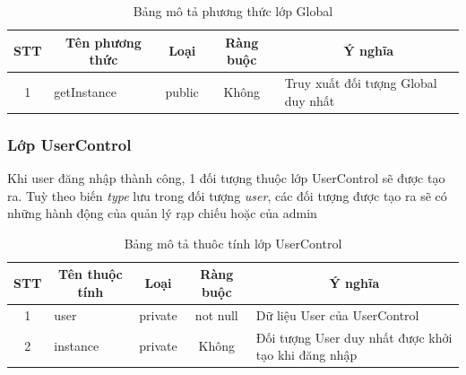 \documentclass[a4paper, 12pt]{article}
\begin{document}
\begin{table}[H]
	\begin{center}
		\begin{tabular}{|c|l|c|c|l|}
			\hline
			STT & \multicolumn{1}{c|}{Tên phương thức} & Loại   & \multicolumn{1}{c|}{Ràng buộc} & \multicolumn{1}{c|}{Ý nghĩa}        \\ \hline
			1   & getInstance                          & public & Không                               & Truy xuất đối tượng Global duy nhất \\ \hline
		\end{tabular}
		\caption{Bảng mô tả phương thức lớp Global}
	\end{center}
\end{table}

\subsubsection{Lớp UserControl}
Khi user đăng nhập thành công, 1 đối tượng thuộc lớp UserControl sẽ được tạo ra. Tuỳ theo biến \textit{type} lưu trong đối tượng \textit{user}, các đối tượng được tạo ra sẽ có những hành động của quản lý rạp chiếu hoặc của admin
\begin{table}[H]
	\begin{center}
		\begin{tabular}{|c|l|c|c|l|}
			\hline
			STT & \multicolumn{1}{c|}{Tên thuộc tính} & Loại                         & \multicolumn{1}{c|}{Ràng buộc} & \multicolumn{1}{c|}{Ý nghĩa}                        \\ \hline
			1   & user                                & private                      & not null                       & Dữ liệu User của UserControl                        \\ \hline
			2   & instance                            & \multicolumn{1}{l|}{private} &          Không                      & Đối tượng User duy nhất được khởi tạo khi đăng nhập \\ \hline
		\end{tabular}
		\caption{Bảng mô tả thuôc tính lớp UserControl}
	\end{center}
\end{table}
\end{document}
